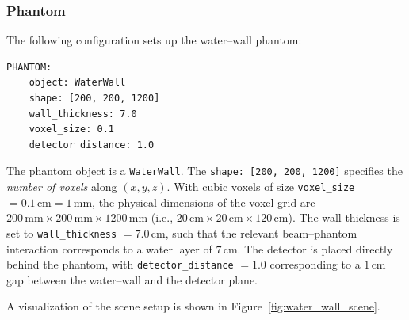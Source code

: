 \subsubsection*{Phantom}
The following configuration sets up the water--wall phantom:

\begin{lstlisting}
PHANTOM:
    object: WaterWall
    shape: [200, 200, 1200]
    wall_thickness: 7.0
    voxel_size: 0.1
    detector_distance: 1.0
\end{lstlisting}

The phantom object is a \texttt{WaterWall}. The \texttt{shape: [200, 200, 1200]}
specifies the \emph{number of voxels} along $(x,y,z)$. With cubic voxels of size
\texttt{voxel\_size} $=0.1\,\mathrm{cm}=1\,\mathrm{mm}$, the physical dimensions
of the voxel grid are $200\,\mathrm{mm} \times 200\,\mathrm{mm} \times
1200\,\mathrm{mm}$ (i.e., $20\,\mathrm{cm} \times 20\,\mathrm{cm} \times
120\,\mathrm{cm}$). The wall thickness is set to \texttt{wall\_thickness}
$=7.0\,\mathrm{cm}$, such that the relevant beam--phantom interaction
corresponds to a water layer of $7\,\mathrm{cm}$. The detector is placed
directly behind the phantom, with \texttt{detector\_distance} $=1.0$
corresponding to a $1\,\mathrm{cm}$ gap between the water--wall and the detector
plane.

A visualization of the scene setup is shown in
Figure~\ref{fig:water_wall_scene}.

